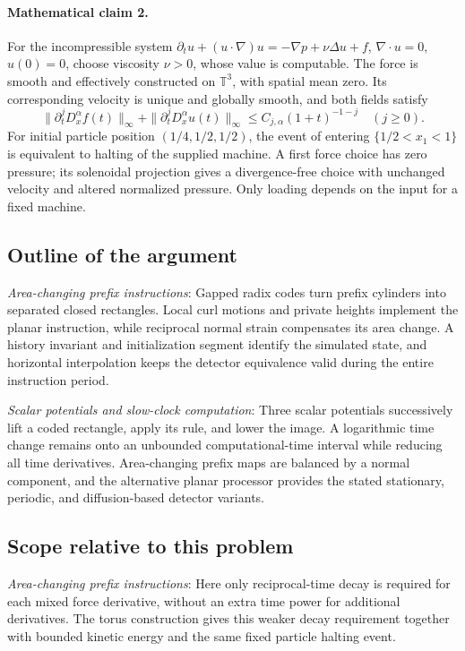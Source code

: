 \documentclass[11pt]{article}
\begin{document}
\paragraph{Mathematical claim 2.} For the incompressible system $\partial_tu+(u\cdot\nabla)u=-\nabla p+\nu\Delta u+f$, $\nabla\cdot u=0$, $u(0)=0$, choose viscosity $\nu>0$, whose value is computable. The force is smooth and effectively constructed on $\mathbb T^3$, with spatial mean zero. Its corresponding velocity is unique and globally smooth, and both fields satisfy \[\|\partial_t^jD_x^\alpha f(t)\|_\infty+\|\partial_t^jD_x^\alpha u(t)\|_\infty\le C_{j,\alpha}(1+t)^{-1-j}\quad(j\ge0).\] For initial particle position $(1/4,1/2,1/2)$, the event of entering $\{1/2<x_1<1\}$ is equivalent to halting of the supplied machine. A first force choice has zero pressure; its solenoidal projection gives a divergence-free choice with unchanged velocity and altered normalized pressure. Only loading depends on the input for a fixed machine.

\subsection{Outline of the argument}
\textit{Area-changing prefix instructions}: Gapped radix codes turn prefix cylinders into separated closed rectangles. Local curl motions and private heights implement the planar instruction, while reciprocal normal strain compensates its area change. A history invariant and initialization segment identify the simulated state, and horizontal interpolation keeps the detector equivalence valid during the entire instruction period.

\textit{Scalar potentials and slow-clock computation}: Three scalar potentials successively lift a coded rectangle, apply its rule, and lower the image. A logarithmic time change remains onto an unbounded computational-time interval while reducing all time derivatives. Area-changing prefix maps are balanced by a normal component, and the alternative planar processor provides the stated stationary, periodic, and diffusion-based detector variants.

\subsection{Scope relative to this problem}
\textit{Area-changing prefix instructions}: Here only reciprocal-time decay is required for each mixed force derivative, without an extra time power for additional derivatives. The torus construction gives this weaker decay requirement together with bounded kinetic energy and the same fixed particle halting event.
\end{document}
